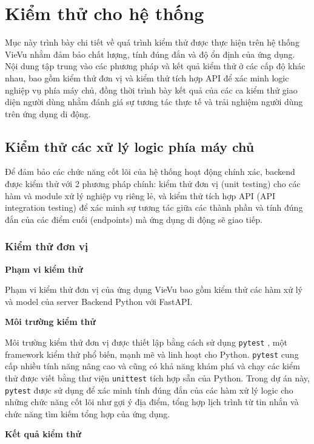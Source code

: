 \section{Kiểm thử cho hệ thống}

Mục này trình bày chi tiết về quá trình kiểm thử được thực hiện trên hệ thống VieVu nhằm đảm bảo chất lượng, tính đúng đắn và độ ổn định của ứng dụng. Nội dung tập trung vào các phương pháp và kết quả kiểm thử ở các cấp độ khác nhau, bao gồm kiểm thử đơn vị và kiểm thử tích hợp API để xác minh logic nghiệp vụ phía máy chủ, đồng thời trình bày kết quả của các ca kiểm thử giao diện người dùng nhằm đánh giá sự tương tác thực tế và trải nghiệm người dùng trên ứng dụng di động.

\subsection{Kiểm thử các xử lý logic phía máy chủ}

Để đảm bảo các chức năng cốt lõi của hệ thống hoạt động chính xác, backend được kiểm thử với 2 phương pháp chính: kiểm thử đơn vị (unit testing) cho các hàm và module xử lý nghiệp vụ riêng lẻ, và kiểm thử tích hợp API (API integration testing) để xác minh sự tương tác giữa các thành phần và tính đúng đắn của các điểm cuối (endpoints) mà ứng dụng di động sẽ giao tiếp.

\subsubsection{Kiểm thử đơn vị}

\textbf{Phạm vi kiểm thử}

\noindent Phạm vi kiểm thử đơn vị của ứng dụng VieVu bao gồm kiểm thử các hàm xử lý và model của server Backend Python với FastAPI. 

\noindent
\textbf{Môi trường kiểm thử}

\noindent Môi trường kiểm thử đơn vị được thiết lập bằng cách sử dụng \texttt{pytest} \cite{pytest}, một framework kiểm thử phổ biến, mạnh mẽ và linh hoạt cho Python. \texttt{pytest} cung cấp nhiều tính năng nâng cao và cũng có khả năng khám phá và chạy các kiểm thử được viết bằng thư viện \texttt{unittest} \cite{unittest} tích hợp sẵn của Python. Trong dự án này, \texttt{pytest} được sử dụng để xác minh tính đúng đắn của các hàm xử lý logic cho những chức năng cốt lõi như gợi ý địa điểm, tổng hợp lịch trình từ tin nhắn và chức năng tìm kiếm tổng hợp của ứng dụng.

\noindent
\textbf{Kết quả kiểm thử}

